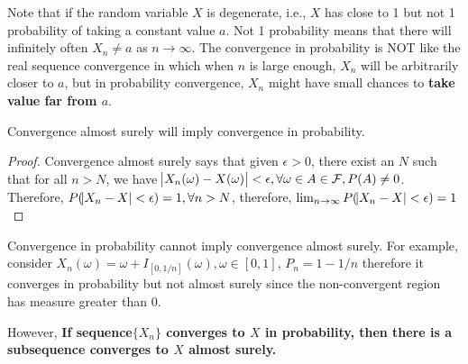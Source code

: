 \begin{refsection}
\begin{remark}
Note that if the random variable $X$ is degenerate, i.e., $X$ has close to 1 but not 1 probability  of taking a constant value $a$. Not 1 probability means that there will infinitely often $X_n \neq a$ as $n \rightarrow \infty$. The convergence in probability is NOT like the real sequence convergence in which when $n$ is large enough, $X_n$ will be arbitrarily closer to $a$, but in probability convergence, $X_n$ might have small chances to \textbf{take value far from $a$}.
\end{remark}

\begin{lemma}
\cite{de2012understanding}\cite{casella2002statistical}Convergence almost surely will imply convergence in probability.
\end{lemma}
\begin{proof}
	Convergence almost surely says that given $\epsilon > 0$, there exist an $N$ such that for all $n > N$, we have $\abs{X_n(\omega) - X(\omega)} < \epsilon, \forall \omega \in A \in \mathcal{F},P(A) \neq 0$. Therefore, $P(\abs{X_n-X}<\epsilon) = 1,\forall n > N$, therefore, $\lim_{n\to \infty} P(\abs{X_n-X}<\epsilon) = 1$
\end{proof}


\begin{remark}
 Convergence in probability cannot imply convergence almost surely. For example, consider $X_n(\omega)=\omega + I_{[0,1/n]}(\omega),\omega \in [0,1]$, $P_n = 1-1/n$ therefore it converges in probability but not almost surely since the non-convergent region has measure greater than 0.

However, \textbf{If sequence$\{X_n\}$ converges to $X$ in probability, then there is a subsequence converges to $X$ almost surely. }
\end{remark}






\end{refsection}
